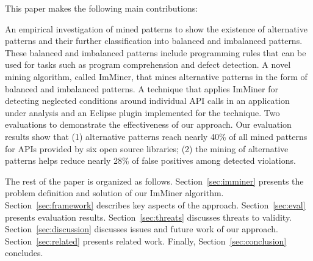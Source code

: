 This paper makes the following main contributions:
\vspace*{1.5ex}
\begin{Itemize}
\Item An empirical investigation of mined patterns to show the existence of alternative patterns and their further classification into balanced and imbalanced patterns. These balanced and imbalanced patterns include programming rules that can be used for tasks such as program comprehension and defect detection.
\vspace*{1.5ex}
\Item A novel mining algorithm, called ImMiner, that mines alternative patterns in the form of balanced and imbalanced patterns. 
\vspace*{1.5ex}
\Item A technique that applies ImMiner for detecting neglected conditions around individual API calls in an application under analysis and an Eclipse plugin implemented for the technique.
\vspace*{1.5ex}
\Item Two evaluations to demonstrate the effectiveness of our approach. Our evaluation results show that (1) alternative patterns reach nearly 40\% of all mined patterns for APIs provided by six open source libraries; (2) the mining of alternative patterns helps reduce nearly 28\% of false positives among detected violations.
\end{Itemize}
\vspace*{1.5ex}
The rest of the paper is organized as follows. 
Section~\ref{sec:imminer} presents the problem definition and solution of our ImMiner algorithm.
Section~\ref{sec:framework} describes key aspects of the approach.
Section~\ref{sec:eval} presents evaluation results.
Section~\ref{sec:threats} discusses threats to validity.
Section~\ref{sec:discussion} discusses issues and future work of our approach.
Section~\ref{sec:related} presents related work.
Finally, Section~\ref{sec:conclusion} concludes.
